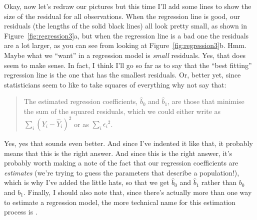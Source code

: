 Okay, now let's redraw our pictures but this time I'll add some lines to show the size of the residual for all observations. When the regression line is good, our residuals (the lengths of the solid black lines) all look pretty small, as shown in Figure~\ref{fig:regression3}a, but when the regression line is a bad one the residuals are a lot larger, as you can see from looking at Figure~\ref{fig:regression3}b. Hmm. Maybe what we ``want'' in a regression model is {\it small} residuals. Yes, that does seem to make sense. In fact, I think I'll go so far as to say that the ``best fitting'' regression line is the one that has the smallest residuals. Or, better yet, since statisticians seem to like to take squares of everything why not say that:
\begin{quote}
The estimated regression coefficients, $\hat{b}_0$ and $\hat{b}_1$, are those that minimise the sum of the squared residuals, which we could either write as $\sum_i (Y_i - \hat{Y}_i)^2 $ or as $\sum_i {\epsilon_i}^2$.
\end{quote}
Yes, yes that sounds even better. And since I've indented it like that, it probably means that this is the right answer. And since this is the right answer, it's probably worth making a note of the fact that our regression coefficients are {\it estimates} (we're trying to guess the parameters that describe a population!), which is why I've added the little hats, so that we get $\hat{b}_0$ and $\hat{b}_1$ rather than $b_0$ and $b_1$. Finally, I should also note that, since there's actually more than one way to estimate a regression model, the more technical name for this estimation process is .  

